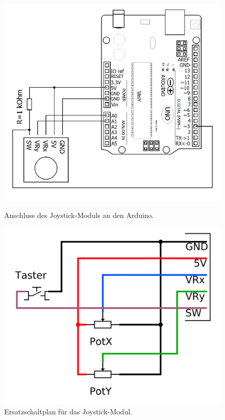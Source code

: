 \begin{figure}[H]
	\hfill
	\begin{minipage}{0.48\textwidth}
		\centering
		\includegraphics[width=\textwidth]{./Zeichnungen/Schaltplan-Joystick.png}
		\caption{Anschluss des Joystick-Moduls an den Arduino.}
	\end{minipage}
	\hfill
	\begin{minipage}{0.38\textwidth}
		\centering
		\includegraphics[width=\textwidth]{./Zeichnungen/Schaltplan-Joystick-Ersatz.png}
		\caption{Ersatzschaltplan für das Joystick-Modul.}
	\end{minipage}
	\hfill
\end{figure}

